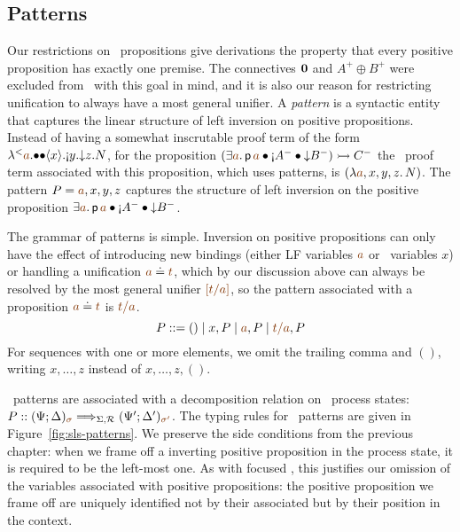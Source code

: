 \subsection{Patterns}
\label{sec:framework-patterns}


Our restrictions on \sls~propositions give derivations the property
that every positive proposition has exactly one premise. 
The connectives $\mathbf{0}$ and $A^+ \oplus B^+$ were excluded
from \sls~with this goal in mind, and it is also our reason for
restricting unification to always have a most general unifier. 
A {\it pattern} is a syntactic entity that captures the linear structure of
left inversion on positive propositions. Instead of having a somewhat
inscrutable proof term of the form
${\tlaml{\texistsl{\lf{a}}
   {\tfusel{\tfusel{\tetap{x}{\tgnabl{y}{\tdownl{z}{N}}}}}}}}$,
for the proposition 
%
$(\exists \lf{a}.\,{\sf p}\,\lf{a} 
             \fuse {\gnab}A^-
             \fuse {\downarrow}B^-) \lefti C^-$
%
the \sls~proof term associated with this proposition, which uses patterns, is
$(\lambda \lf{a},x,y,z.\, N)$. The pattern $P = \lf{a}, x,y,z$ captures
the structure of left inversion on the positive proposition 
$\exists \lf{a}.\,{\sf p}\,\lf{a} 
             \fuse {\gnab}A^-
             \fuse {\downarrow}B^-$.

The grammar of patterns is simple.
% 
Inversion on positive propositions
can only have the effect of introducing new bindings (either LF
variables $\lf{a}$ or \sls~variables $x$) or handling a unification
$\lf{a} \doteq \lf{t}$, which by our discussion above can always be
resolved by the most general unifier $\lf{[t/a]}$, so the pattern associated
with a proposition $\lf{a} \doteq \lf{t}$ is $\lf{t/a}$. 
\[
P ::= () \mid x, P \mid \lf{a}, P \mid \lf{t/a}, P
\] 
For sequences with one or more elements, we omit the trailing
comma and $()$, writing $x, \ldots, z$ 
instead of $x, \ldots, z, ()$. 

\sls~patterns are associated with a decomposition relation on
\sls~process states: $P :: (\Psi; \Delta)_{\lf{\sigma}}
\Longrightarrow_{\Sigma,\subord} (\Psi'; \Delta')_{\lf{\sigma'}}$.
The typing rules for \sls~patterns are given in
Figure~\ref{fig:sls-patterns}. We preserve the side conditions from
the previous chapter: when we frame off a inverting positive
proposition in the process state, it is required to be the left-most
one. As with focused \ollll, this justifies our omission of the
variables associated with positive propositions: the positive
proposition we frame off are uniquely identified not by their
associated but by their position in the context. 

